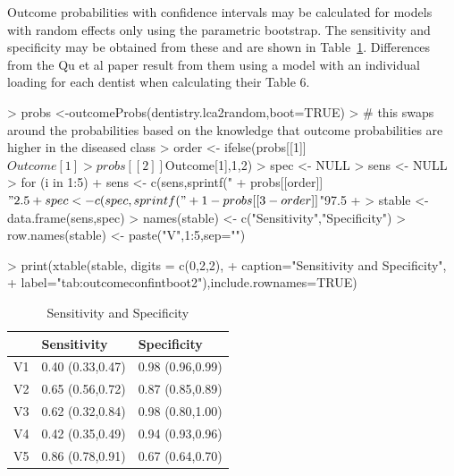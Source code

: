 Outcome probabilities with confidence intervals may be calculated for models with random effects only using the parametric bootstrap. The sensitivity and specificity may be obtained from these and are shown in Table~\ref{tab:outcomeconfintboot2}. Differences from the Qu et al paper result from them using a model with an individual loading for each dentist when calculating their Table 6.


\begin{Schunk}
\begin{Sinput}
> probs <-outcomeProbs(dentistry.lca2random,boot=TRUE)
> # this swaps around the probabilities based on the knowledge that outcome probabilities are higher in the diseased class
> order <- ifelse(probs[[1]]$Outcome[1]>probs[[2]]$Outcome[1],1,2)
> spec <- NULL
> sens <- NULL
> for (i in 1:5) {
+ 	sens <- c(sens,sprintf("%
+       probs[[order]]$"2.5 %
+ 	spec <- c(spec,sprintf("%
+       1-probs[[3-order]]$"97.5 %
+ }
> stable <- data.frame(sens,spec)
> names(stable) <- c("Sensitivity","Specificity")
> row.names(stable) <- paste("V",1:5,sep="")
\end{Sinput}
\end{Schunk}


\begin{Schunk}
\begin{Sinput}
> print(xtable(stable, digits = c(0,2,2),
+ 	caption="Sensitivity and Specificity",
+ 	label="tab:outcomeconfintboot2"),include.rownames=TRUE)
\end{Sinput}
\begin{table}[ht]
\centering
\begin{tabular}{rll}
  \hline
 & Sensitivity & Specificity \\ 
  \hline
V1 & 0.40 (0.33,0.47) & 0.98 (0.96,0.99) \\ 
  V2 & 0.65 (0.56,0.72) & 0.87 (0.85,0.89) \\ 
  V3 & 0.62 (0.32,0.84) & 0.98 (0.80,1.00) \\ 
  V4 & 0.42 (0.35,0.49) & 0.94 (0.93,0.96) \\ 
  V5 & 0.86 (0.78,0.91) & 0.67 (0.64,0.70) \\ 
   \hline
\end{tabular}
\caption{Sensitivity and Specificity} 
\label{tab:outcomeconfintboot2}
\end{table}\end{Schunk}

